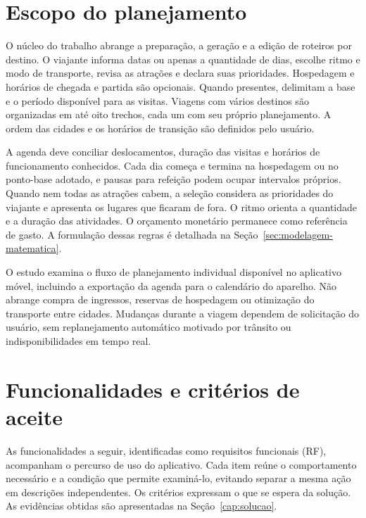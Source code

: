\section{Escopo do planejamento}

O núcleo do trabalho abrange a preparação, a geração e a edição de roteiros por destino. O viajante informa datas ou apenas a quantidade de dias, escolhe ritmo e modo de transporte, revisa as atrações e declara suas prioridades. Hospedagem e horários de chegada e partida são opcionais. Quando presentes, delimitam a base e o período disponível para as visitas. Viagens com vários destinos são organizadas em até oito trechos, cada um com seu próprio planejamento. A ordem das cidades e os horários de transição são definidos pelo usuário.

A agenda deve conciliar deslocamentos, duração das visitas e horários de funcionamento conhecidos. Cada dia começa e termina na hospedagem ou no ponto-base adotado, e pausas para refeição podem ocupar intervalos próprios. Quando nem todas as atrações cabem, a seleção considera as prioridades do viajante e apresenta os lugares que ficaram de fora. O ritmo orienta a quantidade e a duração das atividades. O orçamento monetário permanece como referência de gasto. A formulação dessas regras é detalhada na Seção~\ref{sec:modelagem-matematica}.

O estudo examina o fluxo de planejamento individual disponível no aplicativo móvel, incluindo a exportação da agenda para o calendário do aparelho. Não abrange compra de ingressos, reservas de hospedagem ou otimização do transporte entre cidades. Mudanças durante a viagem dependem de solicitação do usuário, sem replanejamento automático motivado por trânsito ou indisponibilidades em tempo real.

\section{Funcionalidades e critérios de aceite}
\label{sec:requisitos-funcionais}

As funcionalidades a seguir, identificadas como requisitos funcionais (RF), acompanham o percurso de uso do aplicativo. Cada item reúne o comportamento necessário e a condição que permite examiná-lo, evitando separar a mesma ação em descrições independentes. Os critérios expressam o que se espera da solução. As evidências obtidas são apresentadas na Seção~\ref{cap:solucao}.

